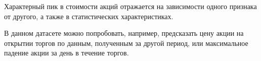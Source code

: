 Характерный пик в стоимости акций отражается на зависимости одного признака от другого, а также в статистических характеристиках.


В данном датасете можно попробовать, например, предсказать цену акции на открытии торгов по данным, полученным за другой период, или максимальное падение акции за день в течение торгов. 